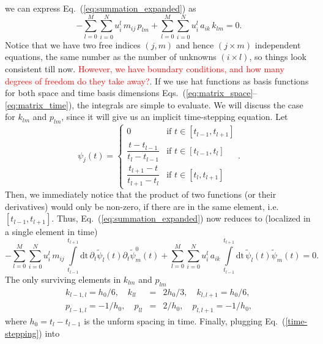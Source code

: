 \documentclass[nofootinbib,preprintnumbers,superscriptaddress,notitlepage]{revtex4-1}
\newcommand{\<}{\begin{equation}}
\newcommand{\?}{\end{equation}}
\begin{document}
we can express Eq.~(\ref{eq:summation_expanded}) as
\begin{equation}
- \sum\limits_{l=0}^{M}\sum\limits_{i=0}^{N} u_i^l\, m_{ij}\, p_{lm} 
+ \sum\limits_{l=0}^{M}\sum\limits_{i=0}^{N} u_i^l\, a_{ik}\, k_{lm} = 0.
\end{equation}
Notice that we have two free indices $(j,m)$ and hence $(j \times m)$
independent equations, the same number as the number of unknowns $(i\times
l)$, so things look consistent till now. \textcolor{red}{However, we have
boundary conditions, and how many degrees of freedom do they take away?}. If
we use hat functions as basis functions for both space and time basis
dimensions Eqs.~(\ref{eq:matrix_space}--\ref{eq:matrix_time}), the integrals
are simple to evaluate. We will discuss the case for $k_{lm}$ and $p_{lm}$,
since it will give us an implicit time-stepping equation. Let
\begin{equation}
\psi_j(t) =  
\begin{cases}
0 & \text{if $t\in \left[t_{l-1},t_{l+1}\right]$} \\
\dfrac{t - t_{l-1}}{t_l - t_{l-1}} & \text{if $t\in \left[t_{l-1},t_{l}\right]$} \\
\dfrac{t_{l+1} - t}{t_{l+1} - t_{l}} & \text{if $t\in \left[t_{l},t_{l+1}\right]$}
\end{cases}.
\end{equation}
Then, we immediately notice that the product of two functions (or their
derivatives) would only be non-zero, if there are in the same element, i.e.
$[t_{l-1}, t_{l+1}]$. Thus, Eq.~(\ref{eq:summation_expanded}) now reduces to
(localized in a single element in time)
\begin{equation}
\label{eq:summation_reduced}
- \sum\limits_{l=0}^{M}\sum\limits_{i=0}^{N} u_i^l\, m_{ij}\, 
\int\limits_{t_{l-1}}^{{t_{l+1}}} \mathrm{dt}\, \partial_t\tilde{\psi}_l(t)\partial_t\tilde{\psi}_m^0(t) 
+ \sum\limits_{l=0}^{M}\sum\limits_{i=0}^{N} u_i^l\, a_{ik}\, 
\int\limits_{t_{l-1}}^{{t_{l+1}}} \mathrm{dt}\, \tilde{\psi}_l(t)\tilde{\psi}_m(t) = 0.
\end{equation}
The only surviving elements in $k_{lm}$ and $p_{lm}$
\begin{eqnarray}
\label{time-stepping}
 k_{l-1, l} = h_0/6, \quad k_{ll} &=& 2 h_0/3, \quad k_{l, l+1} = h_0/6, \\
 p_{l-1, l} = -1/h_0, \quad p_{ll} &=& 2/h_0, \quad p_{l, l+1} = -1/h_0,
\end{eqnarray}
where $h_0 = t_l - t_{l-1}$ is the unform spacing in time. Finally, plugging Eq.~(\ref{time-stepping}) into
\end{document}
